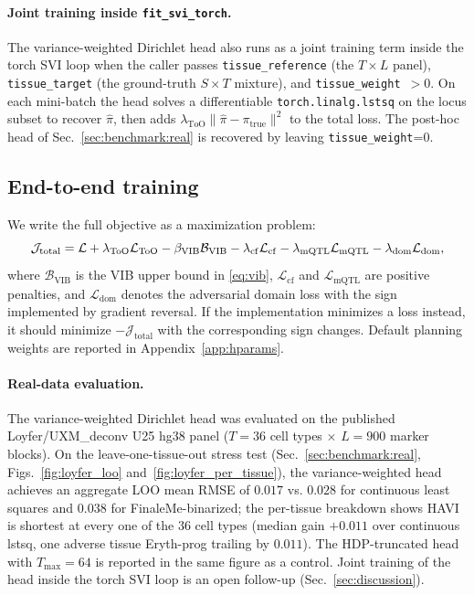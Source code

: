 \paragraph{Joint training inside \texttt{fit\_svi\_torch}.} The variance-weighted Dirichlet head also runs as a joint training term inside the torch SVI loop when the caller passes \texttt{tissue\_reference} (the $T\times L$ panel), \texttt{tissue\_target} (the ground-truth $S\times T$ mixture), and \texttt{tissue\_weight}~$>0$. On each mini-batch the head solves a differentiable \texttt{torch.linalg.lstsq} on the locus subset to recover $\hat\pi$, then adds $\lambda_{\mathrm{ToO}}\|\hat\pi-\pi_{\mathrm{true}}\|^2$ to the total loss. The post-hoc head of Sec.~\ref{sec:benchmark:real} is recovered by leaving \texttt{tissue\_weight}=0.

\subsection{End-to-end training}
We write the full objective as a maximization problem:
\begin{equation}
\mathcal{J}_{\mathrm{total}} = \mathcal{L} + \lambda_{\mathrm{ToO}}\mathcal{L}_{\mathrm{ToO}}
- \beta_{\mathrm{VIB}}\mathcal{B}_{\mathrm{VIB}}
- \lambda_{\mathrm{cf}}\mathcal{L}_{\mathrm{cf}}
- \lambda_{\mathrm{mQTL}}\mathcal{L}_{\mathrm{mQTL}}
- \lambda_{\mathrm{dom}}\mathcal{L}_{\mathrm{dom}},
\label{eq:total-objective}
\end{equation}
where $\mathcal{B}_{\mathrm{VIB}}$ is the VIB upper bound in \eqref{eq:vib}, $\mathcal{L}_{\mathrm{cf}}$ and $\mathcal{L}_{\mathrm{mQTL}}$ are positive penalties, and $\mathcal{L}_{\mathrm{dom}}$ denotes the adversarial domain loss with the sign implemented by gradient reversal. If the implementation minimizes a loss instead, it should minimize $-\mathcal{J}_{\mathrm{total}}$ with the corresponding sign changes. Default planning weights are reported in Appendix~\ref{app:hparams}.

\paragraph{Real-data evaluation.} The variance-weighted Dirichlet head was evaluated on the published Loyfer/UXM\_deconv U25 hg38 panel ($T=36$ cell types $\times$ $L=900$ marker blocks). On the leave-one-tissue-out stress test (Sec.~\ref{sec:benchmark:real}, Figs.~\ref{fig:loyfer_loo} and~\ref{fig:loyfer_per_tissue}), the variance-weighted head achieves an aggregate LOO mean RMSE of $0.017$ vs. $0.028$ for continuous least squares and $0.038$ for FinaleMe-binarized; the per-tissue breakdown shows HAVI is shortest at every one of the $36$ cell types (median gain $+0.011$ over continuous lstsq, one adverse tissue Eryth-prog trailing by $0.011$). The HDP-truncated head with $T_{\max}=64$ is reported in the same figure as a control. Joint training of the head inside the torch SVI loop is an open follow-up (Sec.~\ref{sec:discussion}).

